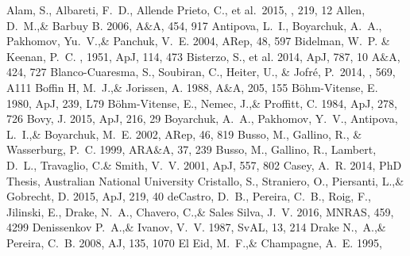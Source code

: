 \documentclass[a4paper,fleqn,usenatbib]{mnras}
\begin{document}
\begin{thebibliography}{99}
 Alam, S., Albareti, F.~D., Allende Prieto, C., et al.\ 2015, \apjs, 219, 12 
Allen, D.~M.,\& Barbuy B. 2006, 
A$\&$A, 454, 917
Antipova, L.~I., Boyarchuk, A.~A., Pakhomov, Yu.~V.,\& Panchuk, V.~E. 2004, 
ARep, 48, 597
Bidelman, W.~P. \& Keenan, P.~C. , 1951, ApJ, 114, 473
Bisterzo, S., et al. 2014, 
ApJ, 787, 10
A$\&$A, 424, 727
 Blanco-Cuaresma, S., Soubiran, C., Heiter, U., \& Jofr{\'e}, P.\ 2014, \aap, 569, A111 
Boffin H, M.~J.,\& Jorissen, A. 1988, 
A$\&$A, 205, 155
B\"ohm-Vitense, E. 1980, 
ApJ, 239, L79
B\"ohm-Vitense, E., Nemec, J.,\& Proffitt, C. 1984, 
ApJ, 278, 726
Bovy, J. 2015, 
ApJ, 216, 29
Boyarchuk, A.~A., Pakhomov, Y.~V., Antipova, L.~I.,\& Boyarchuk, M.~E. 2002, 
ARep, 46, 819
Busso, M., Gallino, R., \& Wasserburg, P.~C. 1999, 
ARA$\&$A, 37, 239
Busso, M., Gallino, R., Lambert, D.~L., Travaglio, C.\& Smith, V.~V. 2001, 
ApJ, 557, 802
Casey, A.~R. 2014, 
PhD Thesis, Australian National University
Cristallo, S., Straniero, O., Piersanti, L.,\& Gobrecht, D. 2015, 
ApJ, 219, 40
deCastro, D.~B., Pereira, C.~B., Roig, F., Jilinski, E., Drake, N.~A., Chavero, C.,\& Sales Silva, J.~V. 2016, 
MNRAS, 459, 4299
Denissenkov P.~A.,\& Ivanov, V.~V. 1987, 
SvAL, 13, 214
Drake N.,~A.,\& Pereira, C.~B. 2008, 
AJ, 135, 1070
El Eid, M.~F.,\& Champagne, A.~E. 1995, 

\end{thebibliography}
\end{document}
